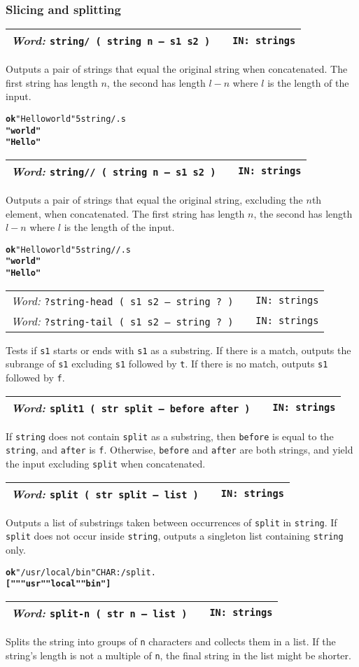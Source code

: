 \documentclass{report}
\newcommand{\ordinaryword}[3]{\index{#1}
\emph{Word:} \texttt{#2} &&\texttt{IN: #3}}
\newcommand{\wordtable}[1]{

\begin{tabularx}{12cm}[t]{lXr}
\hline
#1\\
\hline
\end{tabularx}

}
\begin{document}
\subsubsection{Slicing and splitting}

\wordtable{
\ordinaryword{string/}{string/ ( string n -- s1 s2 )}{strings}
}
Outputs a pair of strings that equal the original string when concatenated. The first string has length $n$, the second has length $l-n$ where $l$ is the length of the input.
\begin{alltt}
\textbf{ok} "Hello world" 5 string/ .s
\textbf{" world"
"Hello"}
\end{alltt}
\wordtable{
\ordinaryword{string//}{string// ( string n -- s1 s2 )}{strings}
}

Outputs a pair of strings that equal the original string, excluding the $n$th element, when concatenated. The first string has length $n$, the second has length $l-n$ where $l$ is the length of the input.
\begin{alltt}
\textbf{ok} "Hello world" 5 string// .s
\textbf{"world"
"Hello"}
\end{alltt}
\wordtable{
\ordinaryword{?string-head}{?string-head~( s1 s2 -- string ?~)}{strings}\\
\ordinaryword{?string-tail}{?string-tail~( s1 s2 -- string ?~)}{strings}
}
Tests if \texttt{s1} starts or ends with \texttt{s1} as a substring. If there is a match, outputs the subrange of \texttt{s1} excluding \texttt{s1} followed by \texttt{t}. If there is no match, outputs \texttt{s1} followed by \texttt{f}.
\wordtable{
\ordinaryword{split1}{split1~( str split -- before after )}{strings}
}
If \texttt{string} does not contain \texttt{split} as a substring, then \texttt{before} is equal to the \texttt{string}, and \texttt{after} is \texttt{f}. Otherwise, \texttt{before} and \texttt{after} are both strings, and yield the input excluding \texttt{split} when concatenated.
\wordtable{
\ordinaryword{split}{split~( str split -- list )}{strings}
}
Outputs a list of substrings taken between occurrences of \texttt{split} in \texttt{string}. If \texttt{split} does not occur inside \texttt{string}, outputs a singleton list containing \texttt{string} only.
\begin{alltt}
\textbf{ok} "/usr/local/bin" CHAR: / split .
\textbf{[ "" "usr" "local" "bin" ]}
\end{alltt}
\wordtable{
\ordinaryword{split-n}{split-n~( str n -- list )}{strings}
}
Splits the string into groups of \texttt{n} characters and collects them in a list. If the string's length is not a multiple of \texttt{n}, the final string in the list might be shorter.
\end{document}
